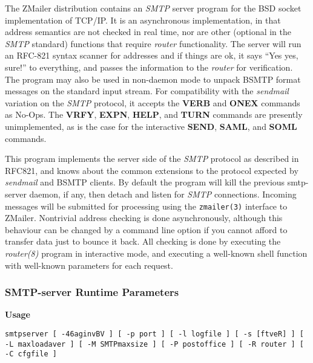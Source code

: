 
The ZMailer distribution contains an {\em SMTP\/} server program for the BSD socket
implementation of TCP/IP.  It is an asynchronous implementation, in that
address semantics are not checked in real time, nor are other (optional in
the {\em SMTP\/} standard) functions that require {\em router\/} functionality. The server
will run an RFC-821 syntax scanner for addresses and if things are ok, it 
says ``Yes yes, sure!'' to everything, and passes the information to
the {\em router\/} for verification.  The program may also be used in non-daemon
mode to unpack BSMTP format messages on the standard input stream.  For
compatibility with the {\em sendmail\/} variation on the {\em SMTP\/} protocol, it accepts
the {\bf VERB} and {\bf ONEX} commands as No-Ops. The {\bf VRFY}, 
{\bf EXPN}, {\bf HELP}, and
{\bf TURN} commands are presently unimplemented, as is the case for the
interactive {\bf SEND}, {\bf SAML}, and {\bf SOML} commands.

This program implements the server side of the {\em SMTP\/} protocol as described in 
RFC821, and knows about the common extensions to the protocol expected by
{\em sendmail\/} and BSMTP clients. By default the program will kill the previous 
smtp-server daemon, if any, then detach and listen for {\em SMTP\/} connections. 
Incoming messages will be submitted for processing using the 
{\tt zmailer(3)} interface to ZMailer. Nontrivial address checking is 
done asynchronously, although this behaviour can be changed by a command 
line option if you cannot afford to transfer data just to bounce it back. 
All checking is done by executing the {\em router(8)\/} program in 
interactive mode, and executing a well-known shell function with well-known 
parameters for each request.




\subsubsection{SMTP-server Runtime Parameters}



{\bf Usage}

{\tt smtpserver [ -46aginvBV ] [ -p port ] [ -l logfile ] [ -s [ftveR] ] [ -L maxloadaver ] [ -M SMTPmaxsize ] [ -P postoffice ] [ -R router ] [ -C cfgfile ]}

